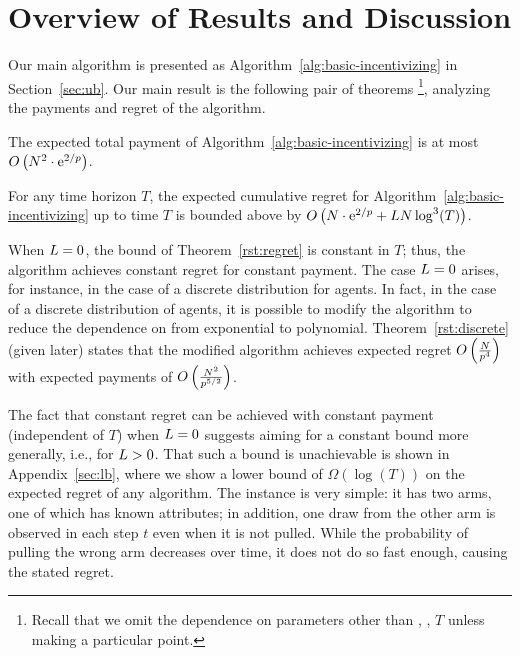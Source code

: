 \section{Overview of Results and Discussion}

Our main algorithm is presented as
Algorithm~\ref{alg:basic-incentivizing}
in Section~\ref{sec:ub}.
Our main result is the following pair of theorems%
\footnote{Recall that we omit the dependence on parameters other than
  \ARMNUM, \MinProb, $T$ unless making a particular point.},
analyzing the payments and regret of the algorithm.

\begin{theorem} \label{rst:budget}
The expected total payment of
Algorithm~\ref{alg:basic-incentivizing} is at most
$O \left(N^2 \cdot \mathrm{e}^{2/p} \right)$.
\end{theorem}

\begin{theorem} \label{rst:regret}
For any time horizon $T$, the expected cumulative regret for
Algorithm~\ref{alg:basic-incentivizing} up to time $T$ is bounded
above by 
$O \left(N \cdot \mathrm{e}^{2/p} + L N \log^3(T) \right)$.
\end{theorem}

When $L = 0$, the bound of Theorem~\ref{rst:regret} is
constant in $T$;
thus, the algorithm achieves constant regret for constant payment. 
The case $L = 0$ arises, for instance, in the case of a
discrete distribution for agents.
In fact, in the case of a discrete distribution of agents,
it is possible to modify the algorithm to reduce the dependence on
\MinProb from exponential to polynomial.
Theorem~\ref{rst:discrete} (given later) states that the modified
algorithm achieves expected regret
$O \left(\frac{N}{p^4} \right)$
with expected payments of
$O \left(\frac{N^2}{p^{5/2}} \right)$.

The fact that constant regret can be achieved with constant payment
(independent of $T$) when $L = 0$ suggests aiming for a
constant bound more generally, i.e., for $L > 0$.
That such a bound is unachievable is shown in Appendix~\ref{sec:lb},
where we show a lower bound of $\Omega(\log(T))$ on
the expected regret of any algorithm.
The instance is very simple: it has two arms, one of which has known
attributes; in addition, one draw from the other arm is observed in
each step $t$ even when it is not pulled.
While the probability of pulling the wrong arm decreases over time, it
does not do so fast enough, causing the stated regret.

